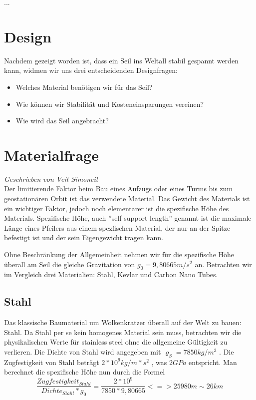 \documentclass[a4paper, 10pt]{report}
\begin{document}
...
\section{Design}

Nachdem gezeigt worden ist, dass ein Seil ins Weltall stabil gespannt werden kann, widmen wir uns drei entscheidenden Designfragen: 
\begin{itemize}
\item Welches Material benötigen wir für das Seil?
\item Wie können wir Stabilität und Kosteneinsparungen vereinen?
\item Wie wird das Seil angebracht?
\end{itemize}

\section{Materialfrage}
\textsl{Geschrieben von Veit Simoneit}\\
Der limitierende Faktor beim Bau eines Aufzugs oder eines Turms bis zum geostationären Orbit ist das verwendete Material. Das Gewicht des Materials ist ein wichtiger Faktor, jedoch noch elementarer ist die spezifische Höhe des Materials. Spezifische Höhe, auch ''self support length'' genannt ist die maximale Länge eines Pfeilers aus einem spezfischen Material, der nur an der Spitze befestigt ist und der sein Eigengewicht tragen kann.\cite{wiki:Specific_strength}

Ohne Beschränkung der Allgemeinheit nehmen wir für die spezifische Höhe überall am Seil die gleiche Gravitation von $g_0 = 9,80665 m/s^2$ an.
Betrachten wir im Vergleich drei Materialien: Stahl, Kevlar und Carbon Nano Tubes. \cite[vergleiche]{ED00}
\subsection{Stahl}
Das klassische Baumaterial um Wolkenkratzer überall auf der Welt zu bauen: Stahl. Da Stahl per se kein homogenes Material sein muss, betrachten wir die physikalischen Werte für stainless steel ohne die allgemeine Gültigkeit zu verlieren. Die Dichte von Stahl wird angegeben mit $\varrho_S = 7850 kg/m^3$ \cite[Vgl.]{PE75}. Die Zugfestigkeit von Stahl beträgt $2*10^9 kg/m*s^2$ , was $2GPa$ entspricht. Man berechnet die spezifische Höhe nun durch die Formel 
\begin{equation}
\frac{Zugfestigkeit_{Stahl}}{Dichte_{Stahl}*g_0} = \frac{2*10^9}{7850*9,80665}
<=> 25 980 m \sim 26 km 
\end{equation}
\end{document}
